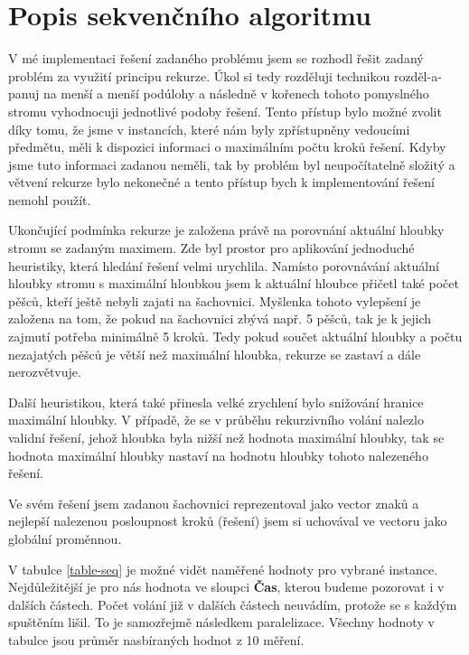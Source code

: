 \documentclass{article} \oddsidemargin=-5mm
\begin{document}

\section{Popis sekvenčního algoritmu}
V mé implementaci řešení zadaného problému jsem se rozhodl řešit zadaný problém za využití principu rekurze. Úkol si tedy rozděluji technikou rozděl-a-panuj na menší a menší podúlohy a následně v kořenech tohoto pomyslného stromu vyhodnocuji jednotlivé podoby řešení. Tento přístup bylo možné zvolit díky tomu, že jsme v instancích, které nám byly zpřístupněny vedoucími předmětu, měli k dispozici informaci o maximálním počtu kroků řešení. Kdyby jsme tuto informaci zadanou neměli, tak by problém byl neupočítatelně složitý a větvení rekurze bylo nekonečné a tento přístup bych k implementování řešení nemohl použít.

Ukončující podmínka rekurze je založena právě na porovnání aktuální hloubky stromu se zadaným maximem. Zde byl prostor pro aplikování jednoduché heuristiky, která hledání řešení velmi urychlila. Namísto porovnávání aktuální hloubky stromu s maximální hloubkou jsem k aktuální hloubce přičetl také počet pěšců, kteří ještě nebyli zajati na šachovnici. Myšlenka tohoto vylepšení je založena na tom, že pokud na šachovnici zbývá např. 5 pěšců, tak je k jejich zajmutí potřeba minimálně 5 kroků. Tedy pokud součet aktuální hloubky a počtu nezajatých pěšců je větší než maximální hloubka, rekurze se zastaví a dále nerozvětvuje.

Další heuristikou, která také přinesla velké zrychlení bylo snižování hranice maximální hloubky. V případě, že se v průběhu rekurzivního volání nalezlo validní řešení, jehož hloubka byla nižší než hodnota maximální hloubky, tak se hodnota maximální hloubky nastaví na hodnotu hloubky tohoto nalezeného řešení.

Ve svém řešení jsem zadanou šachovnici reprezentoval jako vector znaků a nejlepší nalezenou posloupnost kroků (řešení) jsem si uchovával ve vectoru jako globální proměnnou. 

V tabulce \ref{table-seq} je možné vidět naměřené hodnoty pro vybrané instance. Nejdůležitější je pro nás hodnota ve sloupci \textbf{Čas}, kterou budeme pozorovat i v dalších částech. Počet volání již v dalších částech neuvádím, protože se s každým spuštěním lišil. To je samozřejmě následkem paralelizace. Všechny hodnoty v tabulce jsou průměr nasbíraných hodnot z 10 měření.
\end{document}
